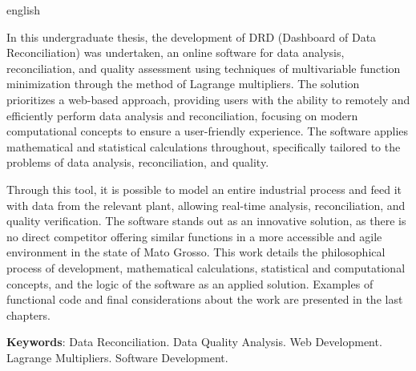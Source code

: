\begin{resumo}
\begin{otherlanguage*}{english}

In this undergraduate thesis, the development of DRD (Dashboard of Data Reconciliation) was undertaken, an online software for data analysis, reconciliation, and quality assessment using techniques of multivariable function minimization through the method of Lagrange multipliers. The solution prioritizes a web-based approach, providing users with the ability to remotely and efficiently perform data analysis and reconciliation, focusing on modern computational concepts to ensure a user-friendly experience. The software applies mathematical and statistical calculations throughout, specifically tailored to the problems of data analysis, reconciliation, and quality.

Through this tool, it is possible to model an entire industrial process and feed it with data from the relevant plant, allowing real-time analysis, reconciliation, and quality verification. The software stands out as an innovative solution, as there is no direct competitor offering similar functions in a more accessible and agile environment in the state of Mato Grosso. This work details the philosophical process of development, mathematical calculations, statistical and computational concepts, and the logic of the software as an applied solution. Examples of functional code and final considerations about the work are presented in the last chapters.

\vspace{\onelineskip}
\noindent 
\textbf{Keywords}: Data Reconciliation. Data Quality Analysis. Web Development. Lagrange Multipliers. Software Development.
\end{otherlanguage*}
\end{resumo}